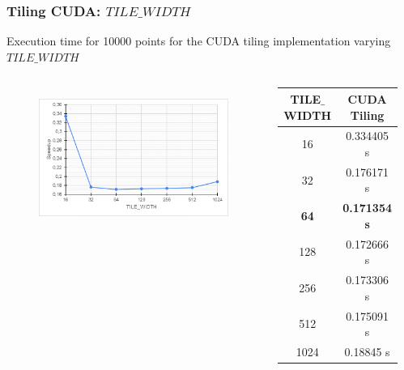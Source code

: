 \documentclass[xcolor=table]{beamer}
\begin{document}
\begin{frame}
\frametitle{Tiling CUDA: $TILE\_WIDTH$}
Execution time for 10000 points for the CUDA tiling implementation varying $TILE\_WIDTH$
\begin{columns}[c]

\begin{figure}
\includegraphics[width=0.99\linewidth]{img/chart_tile_width}
\label{fig:chartTileWidth}
\end{figure}


\begin{table}[]
\centering
\begin{tabular}{|c|c|}
\hline
\textbf{\textbf{TILE$\_$WIDTH}} & \textbf{CUDA Tiling} \\ \hline
16 & 0.334405 s \\ \hline
32 & 0.176171 s \\ \hline
\textbf{64} & \textbf{0.171354 s} \\ \hline
128 & 0.172666 s \\ \hline
256 & 0.173306 s \\ \hline
512 & 0.175091 s \\ \hline
1024 & 0.18845 s \\ \hline
\end{tabular}
\label{tab:tableCudaSpeedup}
\end{table}
\end{columns}
\end{frame}

\end{document}

